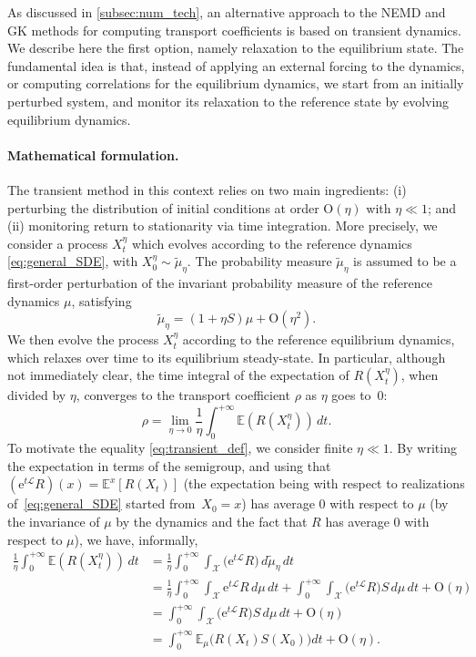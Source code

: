 \documentclass[11pt]{article}
\newcommand{\E}{\mathbb{E}}
\newcommand{\e}{\mathrm{e}}
\renewcommand{\L}{\mathcal{L}}
\newcommand{\bigO}{\mathrm{O}}
\theoremstyle{definition}
\let\oldparagraph=\paragraph
\renewcommand\paragraph[1]{\oldparagraph{#1.}}
\newcommand{\psip}{\widetilde{\mu}_\eta}
\begin{document}
As discussed in \cref{subsec:num_tech}, an alternative approach to the NEMD and GK methods for computing transport coefficients is based on transient dynamics. We describe here the first option, namely relaxation to the equilibrium state. The fundamental idea is that, instead of applying an external forcing to the dynamics, or computing correlations for the equilibrium dynamics, we start from an initially perturbed system, and monitor its relaxation to the reference state by evolving equilibrium dynamics.

\paragraph{Mathematical formulation} The transient method in this context relies on two main ingredients: (i) perturbing the distribution of initial conditions at order $\bigO(\eta)$ with $\eta\ll 1$; and (ii) monitoring return to stationarity via time integration. More precisely, we consider a process $X_t^\eta$ which evolves according to the reference dynamics \eqref{eq:general_SDE}, with $X_0^\eta \sim \psip$. The probability measure $\psip$ is assumed to be a first-order perturbation of the invariant probability measure of the reference dynamics $\mu$, satisfying
\begin{equation}
	\psip = (1+\eta S)\mu + \bigO(\eta^2).
	\label{eq:init_dist}
\end{equation}
We then evolve the process $X_t^\eta$ according to the reference equilibrium dynamics, which relaxes over time to its equilibrium steady-state. In particular, although not immediately clear, the time integral of the expectation of $R(X_t^\eta)$, when divided by $\eta$, converges to the transport coefficient $\rho$ as $\eta$ goes to~$0$:
\begin{equation}
	\rho = \lim_{\eta\to 0} \frac{1}{\eta}\int_0^{+\infty} \E(R(X_t^\eta)) \, dt.
	\label{eq:transient_def}
\end{equation}
To motivate the equality \eqref{eq:transient_def}, we consider finite $\eta\ll 1$. By writing the expectation in terms of the semigroup, and using that $(\e^{t\L}R)(x) = \E^x[R(X_t)]$ (the expectation being with respect to realizations of~\eqref{eq:general_SDE} started from~$X_0=x$) has average 0 with respect to $\mu$ (by the invariance of $\mu$ by the dynamics and the fact that $R$ has average 0 with respect to $\mu$), we have, informally,
\begin{align}
    \label{eq:gk_equiv1}
	\frac{1}{\eta}\int_0^{+\infty} \E(R(X_t^\eta)) \, dt &= \frac{1}{\eta} \int_0^{+\infty} \int_\mathcal{X} \bigl(\e^{t\L} R\bigr) \, d\psip \, dt \\
	&= \frac{1}{\eta}\int_0^{+\infty} \int_\mathcal{X} \e^{t\L} R \, d\mu \, dt + \int_0^{+\infty} \int_\mathcal{X} \bigl(\e^{t\L} R\bigr) S \, d\mu \, dt + \bigO(\eta) \\
	&= \int_0^{+\infty} \int_\mathcal{X} \bigl(\e^{t\L} R\bigr) S \, d\mu \, dt + \bigO(\eta) \\
	&= \int_0^{+\infty} \E_\mu\bigl(R(X_t)S(X_0)\bigr) dt + \bigO(\eta).
    \label{eq:gk_equiv2}
\end{align}
\end{document}
